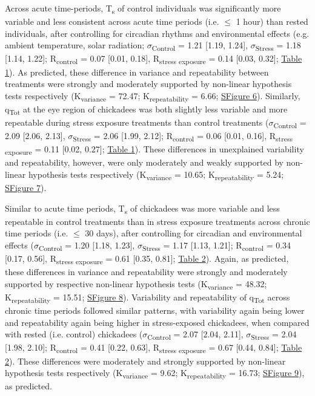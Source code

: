 \documentclass[12pt]{article}
\begin{document}
\noindent Across acute time-periods, T\textsubscript{s} of control individuals was significantly more variable and less consistent across acute time periods (i.e. $\leq$ 1 hour) than rested individuals, after controlling for circadian rhythms and environmental effects (e.g. ambient temperature, solar radiation; $\sigma$\textsubscript{Control} = 1.21 [1.19, 1.24], $\sigma$\textsubscript{Stress} = 1.18 [1.14, 1.22]; R\textsubscript{control} = 0.07 [0.01, 0.18], R\textsubscript{stress exposure} = 0.14 [0.03, 0.32]; \hyperref[Tab4.1]{Table 1}). As predicted, these difference in variance and repeatability between treatments were strongly and moderately supported by non-linear hypothesis tests respectively (K\textsubscript{variance} = 72.47; K\textsubscript{repeatability} = 6.66; \hyperref[FigC.6]{SFigure 6}). Similarly, q\textsubscript{Tot} at the eye region of chickadees was both slightly less variable and more repeatable during stress exposure treatments than control treatments ($\sigma$\textsubscript{Control} = 2.09 [2.06, 2.13], $\sigma$\textsubscript{Stress} = 2.06 [1.99, 2.12]; R\textsubscript{control} = 0.06 [0.01, 0.16], R\textsubscript{stress exposure} = 0.11 [0.02, 0.27]; \hyperref[Tab4.1]{Table 1}). These differences in unexplained variability and repeatability, however, were only moderately and weakly supported by non-linear hypothesis tests respectively (K\textsubscript{variance} = 10.65; K\textsubscript{repeatability} = 5.24; \hyperref[FigC.7]{SFigure 7}). \vspace{1cm}
  
\noindent Similar to acute time periods, T\textsubscript{s} of chickadees was more variable and less repeatable in control treatments than in stress exposure treatments across chronic time periods (i.e. $\leq$ 30 days), after controlling for circadian and environmental effects ($\sigma$\textsubscript{Control} = 1.20 [1.18, 1.23], $\sigma$\textsubscript{Stress} = 1.17 [1.13, 1.21]; R\textsubscript{control} = 0.34 [0.17, 0.56], R\textsubscript{stress exposure} = 0.61 [0.35, 0.81]; \hyperref[Tab4.2]{Table 2}). Again, as predicted, these differences in variance and repeatability were strongly and moderately supported by respective non-linear hypothesis tests (K\textsubscript{variance} = 48.32; K\textsubscript{repeatability} = 15.51; \hyperref[FigC.8]{SFigure 8}). Variability and repeatability of q\textsubscript{Tot} across chronic time periods followed similar patterns, with variability again being lower and repeatability again being higher in stress-exposed chickadees, when compared with rested (i.e. control) chickadees ($\sigma$\textsubscript{Control} = 2.07 [2.04, 2.11], $\sigma$\textsubscript{Stress} = 2.04 [1.98, 2.10]; R\textsubscript{control} = 0.41 [0.22, 0.63], R\textsubscript{stress exposure} = 0.67 [0.44, 0.84]; \hyperref[Tab4.2]{Table 2}). These differences were moderately and strongly supported by non-linear hypothesis tests respectively (K\textsubscript{variance} = 9.62; K\textsubscript{repeatability} = 16.73; \hyperref[FigC.9]{SFigure 9}), as predicted.\vspace{0.5cm}
\end{document}

